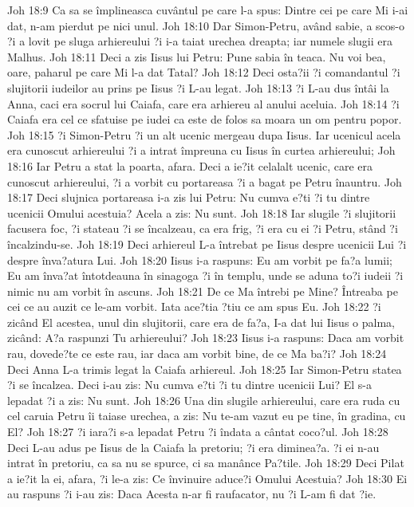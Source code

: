 Joh 18:9  Ca sa se împlineasca cuvântul pe care l-a spus: Dintre cei pe care Mi i-ai dat, n-am pierdut pe nici unul.
Joh 18:10  Dar Simon-Petru, având sabie, a scos-o ?i a lovit pe sluga arhiereului ?i i-a taiat urechea dreapta; iar numele slugii era Malhus.
Joh 18:11  Deci a zis Iisus lui Petru: Pune sabia în teaca. Nu voi bea, oare, paharul pe care Mi l-a dat Tatal?
Joh 18:12  Deci osta?ii ?i comandantul ?i slujitorii iudeilor au prins pe Iisus ?i L-au legat.
Joh 18:13  ?i L-au dus întâi la Anna, caci era socrul lui Caiafa, care era arhiereu al anului aceluia.
Joh 18:14  ?i Caiafa era cel ce sfatuise pe iudei ca este de folos sa moara un om pentru popor.
Joh 18:15  ?i Simon-Petru ?i un alt ucenic mergeau dupa Iisus. Iar ucenicul acela era cunoscut arhiereului ?i a intrat împreuna cu Iisus în curtea arhiereului;
Joh 18:16  Iar Petru a stat la poarta, afara. Deci a ie?it celalalt ucenic, care era cunoscut arhiereului, ?i a vorbit cu portareasa ?i a bagat pe Petru înauntru.
Joh 18:17  Deci slujnica portareasa i-a zis lui Petru: Nu cumva e?ti ?i tu dintre ucenicii Omului acestuia? Acela a zis: Nu sunt.
Joh 18:18  Iar slugile ?i slujitorii facusera foc, ?i stateau ?i se încalzeau, ca era frig, ?i era cu ei ?i Petru, stând ?i încalzindu-se.
Joh 18:19  Deci arhiereul L-a întrebat pe Iisus despre ucenicii Lui ?i despre înva?atura Lui.
Joh 18:20  Iisus i-a raspuns: Eu am vorbit pe fa?a lumii; Eu am înva?at întotdeauna în sinagoga ?i în templu, unde se aduna to?i iudeii ?i nimic nu am vorbit în ascuns.
Joh 18:21  De ce Ma întrebi pe Mine? Întreaba pe cei ce au auzit ce le-am vorbit. Iata ace?tia ?tiu ce am spus Eu.
Joh 18:22  ?i zicând El acestea, unul din slujitorii, care era de fa?a, I-a dat lui Iisus o palma, zicând: A?a raspunzi Tu arhiereului?
Joh 18:23  Iisus i-a raspuns: Daca am vorbit rau, dovede?te ce este rau, iar daca am vorbit bine, de ce Ma ba?i?
Joh 18:24  Deci Anna L-a trimis legat la Caiafa arhiereul.
Joh 18:25  Iar Simon-Petru statea ?i se încalzea. Deci i-au zis: Nu cumva e?ti ?i tu dintre ucenicii Lui? El s-a lepadat ?i a zis: Nu sunt.
Joh 18:26  Una din slugile arhiereului, care era ruda cu cel caruia Petru îi taiase urechea, a zis: Nu te-am vazut eu pe tine, în gradina, cu El?
Joh 18:27  ?i iara?i s-a lepadat Petru ?i îndata a cântat coco?ul.
Joh 18:28  Deci L-au adus pe Iisus de la Caiafa la pretoriu; ?i era diminea?a. ?i ei n-au intrat în pretoriu, ca sa nu se spurce, ci sa manânce Pa?tile.
Joh 18:29  Deci Pilat a ie?it la ei, afara, ?i le-a zis: Ce învinuire aduce?i Omului Acestuia?
Joh 18:30  Ei au raspuns ?i i-au zis: Daca Acesta n-ar fi raufacator, nu ?i L-am fi dat ?ie.
